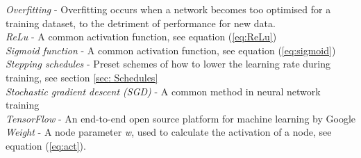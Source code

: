 \documentclass{article}
\begin{document}
\textit{Overfitting} - Overfitting occurs when a network becomes too optimised for a training dataset, to the detriment of performance for new data. \\[0.75ex]
\textit{ReLu} - A common activation function, see equation (\ref{eq:ReLu})\\[0.75ex]
\textit{Sigmoid function} - A common activation function, see equation (\ref{eq:sigmoid})\\[0.75ex]
\textit{Stepping schedules} - Preset schemes of how to lower the learning rate during training, see section \ref{sec: Schedules}\\[0.75ex]
\textit{Stochastic gradient descent (SGD)} - A common method in neural network training \\[0.75ex]
\textit{TensorFlow} - An end-to-end open source platform for machine learning by Google\\[0.75ex]
\textit{Weight} - A node parameter \textit{w}, used to calculate the activation of a node, see equation (\ref{eq:act}).\\\\
\end{document}
